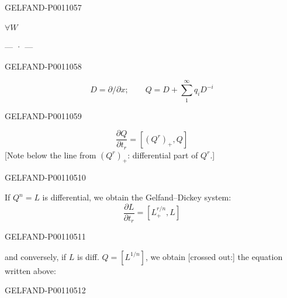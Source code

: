 \begin{GelfandAdjacentEvidence}{GELFAND-P001105}{7}


$\forall W$ 

\begin{center}— · —\end{center}
\end{GelfandAdjacentEvidence}
\begin{GelfandAdjacentEvidence}{GELFAND-P001105}{8}


\[
D=\partial/\partial x;\qquad Q=D+\sum_1^\infty q_i D^{-i}
\]
\end{GelfandAdjacentEvidence}
\begin{GelfandAdjacentEvidence}{GELFAND-P001105}{9}


\[
\frac{\partial Q}{\partial t_r}=[(Q^r)_+,Q]
\]
[Note below the line from $(Q^r)_+$: differential part of $Q^r$.]
\end{GelfandAdjacentEvidence}
\begin{GelfandAdjacentEvidence}{GELFAND-P001105}{10}


If $Q^n=L$ is differential, we obtain the Gelfand–Dickey system:
\[
\frac{\partial L}{\partial t_r}=[L_+^{r/n},L]
\]
\end{GelfandAdjacentEvidence}
\begin{GelfandAdjacentEvidence}{GELFAND-P001105}{11}


and conversely, if $L$ is diff. $Q=[L^{1/n}]$, we obtain [crossed out:]
the equation written above:
\end{GelfandAdjacentEvidence}
\begin{GelfandAdjacentEvidence}{GELFAND-P001105}{12}

\end{GelfandAdjacentEvidence}
